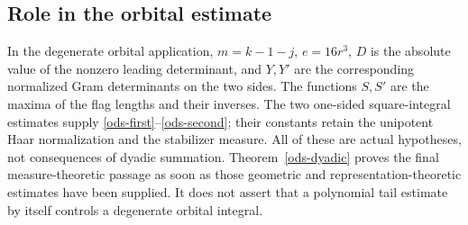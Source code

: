 \subsection{Role in the orbital estimate}

In the degenerate orbital application, $m=k-1-j$, $e=16r^3$,
$D$ is the absolute value of the nonzero leading determinant,
and $Y,Y'$ are the corresponding normalized Gram determinants
on the two sides. The functions $S,S'$ are the maxima of the
flag lengths and their inverses. The two one-sided square-integral
estimates supply \eqref{ods-first}--\eqref{ods-second}; their
constants retain the unipotent Haar normalization and the stabilizer
measure. All of these are actual hypotheses, not consequences of
dyadic summation. Theorem~\ref{ods-dyadic} proves the final
measure-theoretic passage as soon as those geometric and
representation-theoretic estimates have been supplied. It does
not assert that a polynomial tail estimate by itself controls a
degenerate orbital integral.


